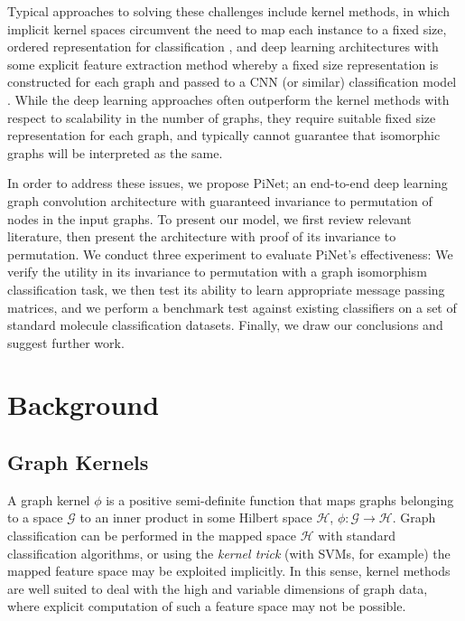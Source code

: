 \documentclass{article}
\theoremstyle{definition}
\begin{document}
Typical approaches to solving these challenges include kernel methods, in which implicit kernel spaces circumvent the need to map each instance to a fixed size, ordered representation for classification \cite{Zhang2018}, and deep learning architectures with some explicit feature extraction method whereby a fixed size representation is constructed for each graph and passed to a CNN (or similar) classification model \cite{Niepert2016}. While the deep learning approaches often outperform the kernel methods with respect to scalability in the number of graphs, they require suitable fixed size representation for each graph, and typically cannot guarantee that isomorphic graphs will be interpreted as the same.

In order to address these issues, we propose PiNet; an end-to-end deep learning graph convolution architecture with guaranteed invariance to permutation of nodes in the input graphs. To present our model, we first review relevant literature, then present the architecture with proof of its invariance to permutation. We conduct three experiment to evaluate PiNet's effectiveness: We verify the utility in its invariance to permutation with a graph isomorphism classification task, we then test its ability to learn appropriate message passing matrices, and we perform a benchmark test against existing classifiers on a set of standard molecule classification datasets. Finally, we draw our conclusions and suggest further work.

\section{Background}

\subsection{Graph Kernels}



A graph kernel $\phi$ is a positive semi-definite function that maps graphs belonging to a space $\mathcal{G}$ to an inner product in some Hilbert space $\mathcal{H}$, $\phi: \mathcal{G} \rightarrow \mathcal{H}$. Graph classification can be performed in the mapped space $\mathcal{H}$ with standard classification algorithms, or using the \emph{kernel trick} (with SVMs, for example) the mapped feature space may be exploited implicitly. In this sense, kernel methods are well suited to deal with the high and variable dimensions of graph data, where explicit computation of such a feature space may not be possible.
\end{document}
